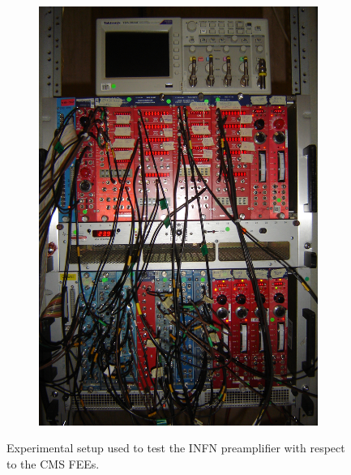 \begin{figure}[H]
		\begin{subfigure}{0.5\linewidth}
		    \centering
			\includegraphics[width = 0.8\linewidth]{fig/chapt6/Pulse-processing-GIF.JPG}
			\caption{\label{fig:Setup-GIF:C}}
		\end{subfigure}
		\caption{\label{fig:Setup-GIF} Experimental setup used to test the INFN preamplifier with respect to the CMS FEEs.}
    \end{figure}
	 
